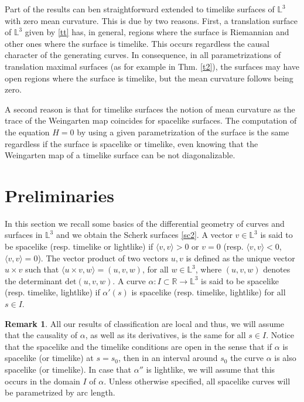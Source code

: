 \documentclass[a4paper,12pt]{amsart}
\numberwithin{equation}{section}
\theoremstyle{definition}
\newtheorem{remark}[theorem]{Remark}
\def\r{\mathbb R}
\def\r{\mathbb R}
\def\rr{\mathbb L}
\begin{document}
 

Part of the results can ben straightforward extended to timelike surfaces of $\rr^3$ with zero mean curvature.  This is due by two reasons. First, a translation surface of $\rr^3$ given by \eqref{tt} has, in general, regions where the surface is Riemannian and other ones where the surface is timelike. This occurs regardless the causal character of the generating curves. In consequence, in all parametrizations of translation maximal surfaces (as for example in Thm. \ref{t2}), the surfaces may have open regions where the surface is timelike, but the mean curvature follows being zero.

  A second reason is that for timelike surfaces the notion of mean curvature as the trace of the Weingarten map coincides for spacelike   surfaces. The computation of the  equation $H=0$ by using a given parametrization of the surface is the same regardless if the surface is spacelike or timelike, even knowing that the Weingarten map of a timelike surface can be not diagonalizable.
 

\section{Preliminaries}\label{s2}

In this section we recall some basics of the differential geometry of curves and surfaces in $\rr^3$ \cite{lo2} and we obtain the  Scherk surfaces \eqref{sc2}. A vector $v\in\rr^3$  is said to be spacelike (resp. timelike or lightlike) if $\langle v,v\rangle>0$ or $v=0$ (resp. $\langle v,v\rangle<0$, $\langle v,v\rangle=0$). The vector product of two vectors $u,v$ is defined as the unique vector $u\times v$ such that $\langle u\times v,w\rangle=(u,v,w)$,  for all $w\in\rr^3$, where $(u,v,w)$ denotes the determinant   $\mbox{det}(u,v,w)$. 
   A curve $\alpha\colon I\subset\r\to\rr^3$  is said to be spacelike (resp. timelike, lightlike) if $\alpha'(s)$ is spacelike (resp. timelike, lightlike) for all $s\in I$. 
 
 \begin{remark} All our results of classification are local and thus, we will assume that  the causality of $\alpha$, as well as its derivatives, is the same for all $s\in I$. Notice that the spacelike and the timelike conditions are open in the sense that if $\alpha$ is spacelike (or timelike) at $s=s_0$, then in an interval around $s_0$ the curve $\alpha$ is also spacelike (or timelike). In case that $\alpha''$ is lightlike, we will assume that this occurs in the domain $I$ of $\alpha$. Unless otherwise specified, all spacelike curves will be parametrized by arc length. 
\end{remark}
  
\end{document}
